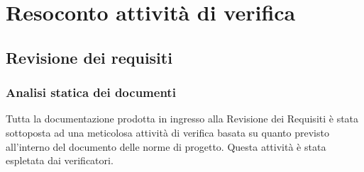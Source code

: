 \section{Resoconto attività di verifica} \label{_resocontoVerifica}

\subsection{Revisione dei requisiti}

\subsubsection{Analisi statica dei documenti}
Tutta la documentazione prodotta in ingresso alla Revisione dei Requisiti è stata sottoposta ad una meticolosa attività di verifica
basata su quanto previsto all'interno del documento delle norme di progetto.
Questa attività è stata espletata dai verificatori.

